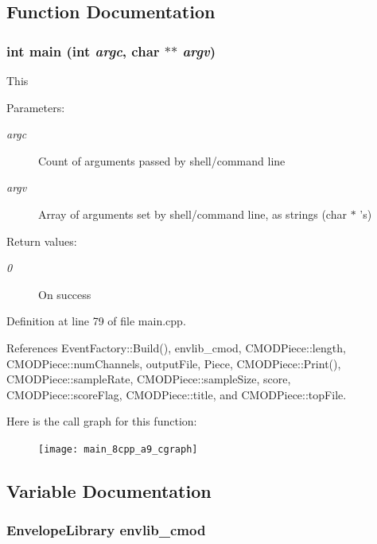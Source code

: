 \subsection{Function Documentation}
\subsubsection{\setlength{\rightskip}{0pt plus 5cm}int main (int {\em argc}, char $\ast$$\ast$ {\em argv})}\label{main_8cpp_a9}


This \begin{Desc}
\item[Parameters:]
\begin{description}
\item[{\em argc}]Count of arguments passed by shell/command line \item[{\em argv}]Array of arguments set by shell/command line, as strings (char $\ast$ 's) \end{description}
\end{Desc}
\begin{Desc}
\item[Return values:]
\begin{description}
\item[{\em 0}]On success \end{description}
\end{Desc}


Definition at line 79 of file main.cpp.

References Event\-Factory::Build(), envlib\_\-cmod, CMODPiece::length, CMODPiece::num\-Channels, output\-File, Piece, CMODPiece::Print(), CMODPiece::sample\-Rate, CMODPiece::sample\-Size, score, CMODPiece::score\-Flag, CMODPiece::title, and CMODPiece::top\-File.

Here is the call graph for this function:\begin{figure}[H]
\begin{center}
\leavevmode
\texttt{[image: main\_8cpp\_a9\_cgraph]}
\end{center}
\end{figure}


\subsection{Variable Documentation}
\subsubsection{\setlength{\rightskip}{0pt plus 5cm}Envelope\-Library {\bf envlib\_\-cmod}}\label{main_8cpp_a1}




